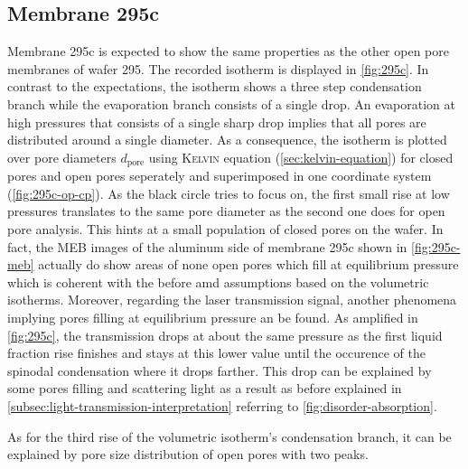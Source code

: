 \documentclass[thesis.tex]{subfiles}
\begin{document}
        \subsection{Membrane 295c}
        \label{subsec:295c}

          Membrane 295c is expected to show the same properties as the other open pore membranes of wafer 295. The recorded isotherm is displayed in \cref{fig:295c}. In contrast to the expectations, the isotherm shows a three step condensation branch while the evaporation branch consists of a single drop. An evaporation at high pressures that consists of a single sharp drop implies that all pores are distributed around a single diameter. As a consequence, the isotherm is plotted over pore diameters $d_\mathrm{pore}$ using \textsc{Kelvin} equation (\cref{sec:kelvin-equation}) for closed pores and open pores seperately and superimposed in one coordinate system (\cref{fig:295c-op-cp}). As the black circle tries to focus on, the first small rise at low pressures translates to the same pore diameter as the second one does for open pore analysis. This hints at a small population of closed pores on the wafer. In fact, the MEB images of the aluminum side of membrane 295c shown in \cref{fig:295c-meb} actually do show areas of none open pores which fill at equilibrium pressure which is coherent with the before amd assumptions based on the volumetric isotherms. Moreover, regarding the laser transmission signal, another phenomena implying pores filling at equilibrium pressure an be found. As amplified in \cref{fig:295c}, the transmission drops at about the same pressure as the first liquid fraction rise finishes and stays at this lower value until the occurence of the spinodal condensation where it drops farther. This drop can be explained by some pores filling and scattering light as a result as before explained in \cref{subsec:light-transmission-interpretation} referring to \cref{fig:disorder-absorption}.

          As for the third rise of the volumetric isotherm's condensation branch, it can be explained by pore size distribution of open pores with two peaks.


          
\end{document}
